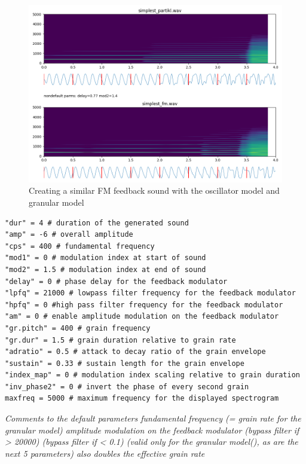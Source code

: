 \documentclass[runningheads,a4paper]{llncs}
\begin{document}
\begin{figure}
	\centering
	\includegraphics[width=.95\textwidth]{simplest_comparison.png}
	\caption{Creating a similar FM feedback sound with the oscillator model and granular model}
	\label{fig:simplest}
\end{figure}

\noindent\begin{minipage}{\linewidth}
\begin{lstlisting}[caption=Default parameters for the synthesis models, label=lst:defaultparameters]
"dur" = 4 # duration of the generated sound
"amp" = -6 # overall amplitude
"cps" = 400 # fundamental frequency 
"mod1" = 0 # modulation index at start of sound
"mod2" = 1.5 # modulation index at end of sound
"delay" = 0 # phase delay for the feedback modulator
"lpfq" = 21000 # lowpass filter frequency for the feedback modulator 
"hpfq" = 0 #high pass filter frequency for the feedback modulator 
"am" = 0 # enable amplitude modulation on the feedback modulator
"gr.pitch" = 400 # grain frequency 
"gr.dur" = 1.5 # grain duration relative to grain rate
"adratio" = 0.5 # attack to decay ratio of the grain envelope
"sustain" = 0.33 # sustain length for the grain envelope
"index_map" = 0 # modulation index scaling relative to grain duration
"inv_phase2" = 0 # invert the phase of every second grain
maxfreq = 5000 # maximum frequency for the displayed spectrogram
\end{lstlisting}
\emph{Comments to the default parameters
	fundamental frequency (= grain rate for the granular model)
	amplitude modulation on the feedback modulator
	(bypass filter if > 20000)
	(bypass filter if < 0.1)
	(valid only for the granular model(), as are the next 5 parameters)
	also doubles the effective grain rate}
\end{minipage}
\end{document}
